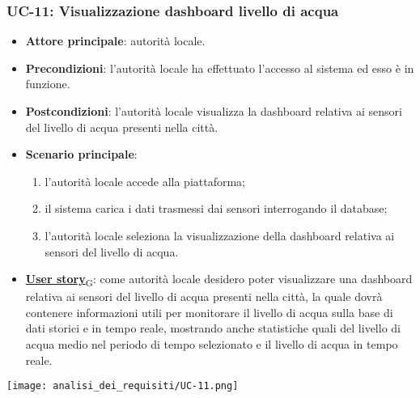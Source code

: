 \subsubsection{UC-11: Visualizzazione dashboard livello di acqua}
\begin{itemize}
	\item \textbf{Attore principale}: autorità locale.
	\item \textbf{Precondizioni}: l'autorità locale ha effettuato l'accesso al sistema ed esso è in funzione.
	\item \textbf{Postcondizioni}: l'autorità locale visualizza la dashboard relativa
	      ai sensori del livello di acqua presenti nella città.
	\item \textbf{Scenario principale}:
	      \begin{enumerate}
		      \item l'autorità locale accede alla piattaforma;
		      \item il sistema carica i dati trasmessi dai sensori interrogando il database;
		      \item l'autorità locale seleziona la visualizzazione della dashboard relativa ai sensori del livello di acqua.
	      \end{enumerate}
	\item \href{https://7last.github.io/docs/rtb/documentazione-interna/glossario\#user-story}{\textbf{User story}\textsubscript{G}}:
	      come autorità locale desidero poter visualizzare una dashboard relativa ai sensori del livello di acqua presenti nella città, la quale
	      dovrà contenere informazioni utili per monitorare il livello di acqua sulla base di dati storici e in tempo reale, mostrando
	      anche statistiche quali del livello di acqua medio nel periodo di tempo selezionato e il livello di acqua in tempo reale.
\end{itemize}
\begin{center}
	\texttt{[image: analisi\_dei\_requisiti/UC-11.png]}
\end{center}


